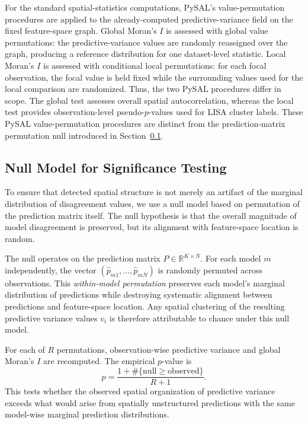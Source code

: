 For the standard spatial-statistics computations, PySAL's value-permutation procedures
are applied to the already-computed predictive-variance field on the fixed feature-space
graph. Global Moran's $I$ is assessed with global value permutations: the predictive-variance
values are randomly reassigned over the graph, producing a reference distribution for one
dataset-level statistic. Local Moran's $I$ is assessed with conditional local permutations:
for each focal observation, the focal value is held fixed while the surrounding values used
for the local comparison are randomized. Thus, the two PySAL procedures differ in scope.
The global test assesses overall spatial autocorrelation, whereas the local test provides
observation-level pseudo-$p$-values used for LISA cluster labels. These PySAL
value-permutation procedures are distinct from the prediction-matrix permutation null
introduced in Section~\ref{sec:meth-null}.


\subsection{Null Model for Significance Testing}
\label{sec:meth-null}

To ensure that detected spatial structure is not merely an artifact of the marginal
distribution of disagreement values, we use a null model based on permutation of the
prediction matrix itself. The null hypothesis is that the overall magnitude of model
disagreement is preserved, but its alignment with feature-space location is random.

The null operates on the prediction matrix $P \in \mathbb{R}^{K \times N}$. For each model
$m$ independently, the vector $(\hat{p}_{m1}, \dots, \hat{p}_{mN})$ is randomly permuted
across observations. This \emph{within-model permutation} preserves each model's
marginal distribution of predictions while destroying systematic alignment between
predictions and feature-space location. Any spatial clustering of the resulting predictive
variance values $v_i$ is therefore attributable to chance under this null model.

For each of $R$ permutations, observation-wise predictive variance and global Moran's
$I$ are recomputed. The empirical $p$-value is
\[
p = \frac{1 + \#\{\text{null} \geq \text{observed}\}}{R + 1}.
\]
This tests whether the observed spatial organization of predictive variance exceeds what
would arise from spatially unstructured predictions with the same model-wise marginal
prediction distributions.


